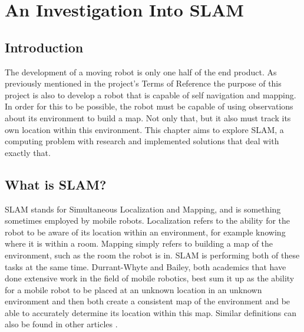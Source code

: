 		
		\chapter{An Investigation Into SLAM}
			\section{Introduction}
			The development of a moving robot is only one half of the end product. As previously mentioned in the project's Terms of Reference the purpose of this project is also to develop a robot that is capable of self navigation and mapping. In order for this to be possible, the robot must be capable of using observations about its environment to build a map. Not only that, but it also must track its own location within this environment. This chapter aims to explore SLAM, a computing problem with research and implemented solutions that deal with exactly that.
		
			\section{What is SLAM?}
			SLAM stands for Simultaneous Localization and Mapping, and is something sometimes employed by mobile robots. Localization refers to the ability for the robot to be aware of its location within an environment, for example knowing where it is within a room. Mapping simply refers to building a map of the environment, such as the room the robot is in. SLAM is performing both of these tasks at the same time. Durrant-Whyte and Bailey\citep{durrant2006simultaneous}, both academics that have done extensive work in the field of mobile robotics, best sum it up as the ability for a mobile robot to be placed at an unknown location in an unknown environment and then both create a consistent map of the environment and be able to accurately determine its location within this map. Similar definitions can also be found in other articles \citep{choset2001topological, dissanayake2001solution}.
		
